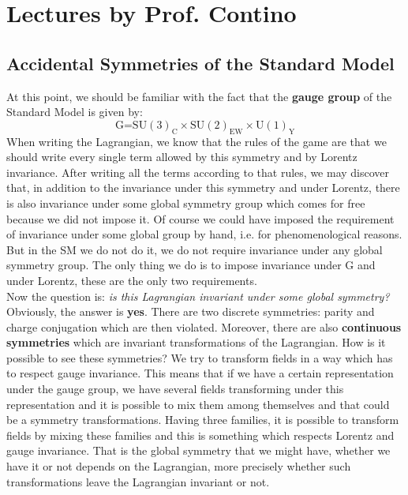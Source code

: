 \documentclass[../main.tex]{subfiles}
\begin{document}
\setchapterpreamble[u]{\margintoc}
\chapter[Lectures by Prof. Contino]{Lectures by Prof. Contino\footnotemark[0]}
\section{Accidental Symmetries of the Standard Model}
At this point, we should be familiar with the fact that the \textbf{gauge group} of the Standard Model is given by:
\[
\text{G=SU$(3)_{\text{C}}\times$SU$(2)_{\text{EW}}\times$U$(1)_{\text{Y}}$}
\]
When writing the Lagrangian, we know that the rules of the game are that we should write every single term allowed by this symmetry and by Lorentz invariance. After writing all the terms according to that rules, we may discover that, in addition to the invariance under this symmetry and under Lorentz, there is also invariance under some global symmetry group which comes for free because we did not impose it. Of course we could have imposed the requirement of invariance under some global group by hand, i.e. for phenomenological reasons. But in the SM we do not do it, we do not require invariance under any global symmetry group. The only thing we do is to impose invariance under G and under Lorentz, these are the only two requirements.\\
Now the question is: \textit{is this Lagrangian invariant under some global symmetry?} Obviously, the answer is \textbf{yes}. There are two discrete symmetries: parity and charge conjugation which are then violated. Moreover, there are also \textbf{continuous symmetries} which are invariant transformations of the Lagrangian. How is it possible to see these symmetries? We try to transform fields in a way which has to respect gauge invariance. This means that if we have a certain representation under the gauge group, we have several fields transforming under this representation and it is possible to mix them among themselves and that could be a symmetry transformations. Having three families, it is possible to transform fields by mixing these families and this is something which respects Lorentz and gauge invariance. That is the global symmetry that we might have, whether we have it or not depends on the Lagrangian, more precisely whether such transformations leave the Lagrangian invariant or not.
\end{document}
